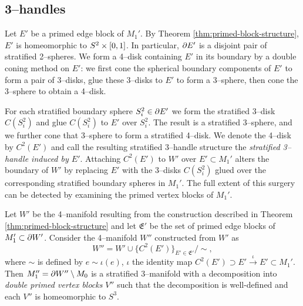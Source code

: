 \subsection{3--handles}
\label{subsec:smooth-3handles}

Let $E'$ be a primed edge block of $M_1'$.
By Theorem \ref{thm:primed-block-structure}, $E'$ is homeomorphic to $S^2\times[0,1]$.
In particular, $\partial E'$ is a disjoint pair of stratified 2--spheres.
We form a 4--disk containing $E'$ in its boundary by a double coning method on $E'$: we first cone the spherical boundary components of $E'$ to form a pair of 3--disks, glue these 3--disks to $E'$ to form a 3--sphere, then cone the 3--sphere to obtain a 4--disk.

For each stratified boundary sphere $S_i^2\in\partial E'$ we form the stratified 3--disk $C(S_i^2)$ and glue $C(S_i^2)$ to $E'$ over $S_i^2$.
The result is a stratified 3--sphere, and we further cone that 3--sphere to form a stratified 4--disk.
We denote the 4--disk by $C^2(E')$ and call the resulting stratified 3--handle structure the \emph{stratified 3--handle induced by $E'$}.
Attaching $C^2(E')$ to $W'$ over $E'\subset M_1'$ alters the boundary of $W'$ by replacing $E'$ with the 3--disks $C(S_i^2)$ glued over the corresponding stratified boundary spheres in $M_1'$.
The full extent of this surgery can be detected by examining the primed vertex blocks of $M_1'$.

\begin{cor}
	\label{thm:primed-primed-block-structure}
	Let $W'$ be the 4--manifold resulting from the construction described in Theorem \ref{thm:primed-block-structure} and let $\mathfrak{E}'$ be the set of primed edge blocks of $M_1'\subset\partial W'$.
	Consider the 4--manifold $W''$ constructed from $W'$ as
	\[
	W'' = W'\cup\{C^2(E')\}_{E'\in \mathfrak{E}'} / \sim,
	\]
	where $\sim$ is defined by $e\sim \iota(e)$, $\iota$ the identity map $C^2(E')\supset E'\overset{\iota}{\to} E'\subset M_1'$.
	Then $M_1''=\partial W''\setminus M_0$ is a stratified 3--manifold with a decomposition into \emph{double primed vertex blocks} $V''$ such that the decomposition is well-defined and each $V''$ is homeomorphic to $S^3$.
\end{cor}

